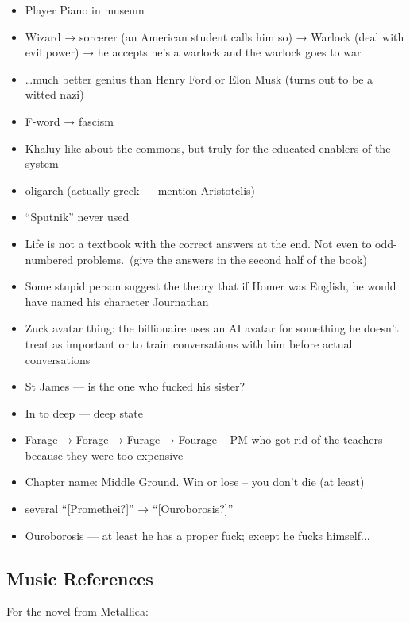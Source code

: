 \documentclass[12pt]{article}
\begin{document}
\begin{itemize}
  \item Player Piano in museum
  \item Wizard → sorcerer (an American student calls him so) → Warlock (deal with evil power) →  he accepts he’s a warlock and the warlock goes to war
  \item \ldots{}much better genius than Henry Ford or Elon Musk (turns out to be a witted nazi)
  \item F-word → fascism
  \item Khaluy like about the commons, but truly for the educated enablers of the system
  \item oligarch (actually greek — mention Aristotelis)
  \item “Sputnik” never used
  \item Life is not a textbook with the correct answers at the end. Not even to odd-numbered problems.\ (give the answers in the second half of the book)
  \item Some stupid person suggest the theory that if Homer was English, he would have named his character Journathan
  \item Zuck avatar thing: the billionaire uses an AI avatar for something he doesn’t treat as important or to train conversations with him before actual conversations
  \item St James — is the one who fucked his sister?
  \item In to deep — deep state
  \item Farage → Forage → Furage → Fourage -- PM who got rid of the teachers because they were too expensive
  \item Chapter name: Middle Ground. Win or lose -- you don't die (at least)
  \item several “[Promethei?]” → “[Ouroborosis?]”
  \item Ouroborosis — at least he has a proper fuck; except he fucks himself...
\end{itemize}

\subsection{Music References}

For the novel from Metallica:
\end{document}
